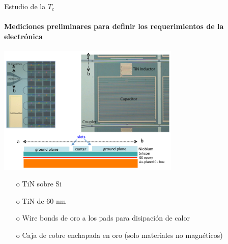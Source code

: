 \documentclass[ignorenonframetext,12pt]{beamer}
\begin{document}
\begin{frame}{Estudio de la $T_c$}
				\framesubtitle{Mediciones preliminares para definir los requerimientos
				de la electrónica}
				\centering
												\includegraphics[width=0.65\textwidth]{mkid_ucsb2}
												\footnotesize{\begin{itemize}
																\item[o] TiN sobre Si
																\item[o] TiN de 60 nm
																\item[o] Wire bonds de oro a los pads para
																				disipación de calor
																\item[o] Caja de cobre enchapada en oro (solo
																				materiales no magnéticos)

												\end{itemize}}
\end{frame}
\end{document}

